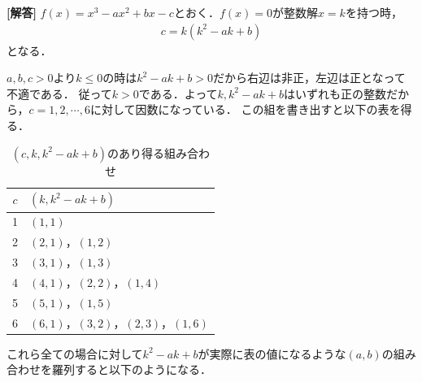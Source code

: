\documentclass[../../main.tex]{subfiles}
\begin{document}
\begin{oframed}
  
\end{oframed}

{\bf [解答]}
$f(x)=x^3-ax^2+bx-c$とおく．$f(x)=0$が整数解$x=k$を持つ時，
\begin{align}
  c=k(k^2-ak+b) \label{eq:1}
\end{align}
となる．

$a,b,c>0$より$k \le 0$の時は$k^2-ak+b>0$だから右辺は非正，左辺は正となって不適である．
従って$k>0$である．よって$k, k^2-ak+b$はいずれも正の整数だから，$c=1,2,\cdots,6$に対して因数になっている．
この組を書き出すと以下の表を得る．
\begin{table}[htb]
  \centering
  \caption{$(c,k,k^2-ak+b)$のあり得る組み合わせ}
  \begin{tabular}{c|l}
    $c$ & $(k,k^2-ak+b)$ \\
    \hline
    1 & $(1,1)$ \\
    2 & $(2,1)$，$(1,2)$ \\
    3 & $(3,1)$，$(1,3)$ \\
    4 & $(4,1)$，$(2,2)$，$(1,4)$ \\
    5 & $(5,1)$，$(1,5)$ \\
    6 & $(6,1)$，$(3,2)$，$(2,3)$，$(1,6)$
  \end{tabular}
\end{table}

これら全ての場合に対して$k^2-ak+b$が実際に表の値になるような$(a,b)$の組み合わせを羅列すると以下のようになる．
\end{document}
